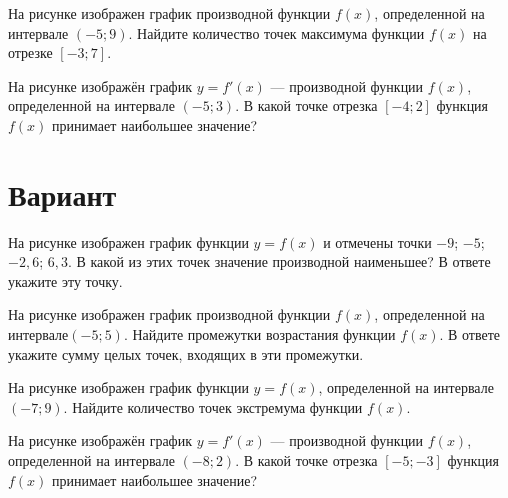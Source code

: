 \begin{taskBN}{3}
На рисунке изображен график производной функции $f(x)$, определенной на интервале $(-5;9)$. Найдите количество точек максимума функции $f(x)$ на отрезке $[-3;7]$. 
\end{taskBN}

\begin{taskBN}{4}
На рисунке изображён график $y=f'(x)$ — производной функции $f(x)$, определенной на интервале $(-5;3)$. В какой точке отрезка $[-4; 2]$ функция $f(x)$ принимает наибольшее значение?
\end{taskBN}

\newpage\section{Вариант}\begin{taskBN}{1}
На рисунке изображен график функции $y=f(x)$ и отмечены точки $-9$; $-5$; $-2,6$; $6,3$. В какой из этих точек значение производной наименьшее? В ответе укажите эту точку. 
\end{taskBN}

\begin{taskBN}{2}
На рисунке изображен график производной функции $f(x)$, определенной на интервале$(-5; 5)$. Найдите промежутки возрастания функции $f(x)$. В ответе укажите сумму целых точек, входящих в эти промежутки.
\end{taskBN}

\begin{taskBN}{3}
На рисунке изображен график функции $y=f(x)$, определенной на интервале $(-7;9)$. Найдите количество точек экстремума функции $f(x)$.
\end{taskBN}

\begin{taskBN}{4}
На рисунке изображён график $y=f'(x)$ — производной функции $f(x)$, определенной на интервале $(-8;2)$. В какой точке отрезка $[-5; -3]$ функция $f(x)$ принимает наибольшее значение?
\end{taskBN}

